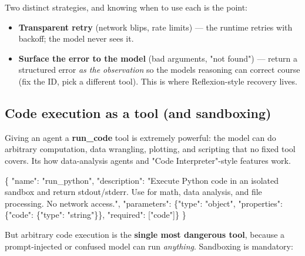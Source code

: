 \documentclass[11pt]{article}
\providecommand{\tightlist}{\setlength{\itemsep}{1pt}\setlength{\parskip}{0pt}}
\newenvironment{Shaded}{\begin{snugshade}}{\end{snugshade}}
\newcommand{\DataTypeTok}[1]{\textcolor[rgb]{0.16,0.50,0.73}{#1}}
\newcommand{\FunctionTok}[1]{\textcolor[rgb]{0.56,0.27,0.68}{#1}}
\newcommand{\OtherTok}[1]{\textcolor[rgb]{0.15,0.68,0.38}{#1}}
\newcommand{\StringTok}[1]{\textcolor[rgb]{0.96,0.31,0.31}{#1}}
\begin{document}
Two distinct strategies, and knowing when to use each is the point:

\begin{itemize}
\tightlist
\item
  \textbf{Transparent retry} (network blips, rate limits) --- the runtime retries with backoff; the model never sees it.
\item
  \textbf{Surface the error to the model} (bad arguments, "not found") --- return a structured error \emph{as the observation} so the model\textquotesingle s reasoning can correct course (fix the ID, pick a different tool). This is where Reflexion-style recovery lives.
\end{itemize}

\subsection{Code execution as a tool (and sandboxing)}\label{code-execution-as-a-tool-and-sandboxing}

Giving an agent a \textbf{run\_code} tool is extremely powerful: the model can do arbitrary computation, data wrangling, plotting, and scripting that no fixed tool covers. It\textquotesingle s how data-analysis agents and "Code Interpreter"-style features work.


\begin{Shaded}
\begin{Highlighting}[]
\FunctionTok{\{}
  \DataTypeTok{"name"}\FunctionTok{:} \StringTok{"run\_python"}\FunctionTok{,}
  \DataTypeTok{"description"}\FunctionTok{:} \StringTok{"Execute Python code in an isolated sandbox and return stdout/stderr. Use for math, data analysis, and file processing. No network access."}\FunctionTok{,}
  \DataTypeTok{"parameters"}\FunctionTok{:} \FunctionTok{\{}\DataTypeTok{"type"}\FunctionTok{:} \StringTok{"object"}\FunctionTok{,}
    \DataTypeTok{"properties"}\FunctionTok{:} \FunctionTok{\{}\DataTypeTok{"code"}\FunctionTok{:} \FunctionTok{\{}\DataTypeTok{"type"}\FunctionTok{:} \StringTok{"string"}\FunctionTok{\}\},} \DataTypeTok{"required"}\FunctionTok{:} \OtherTok{[}\StringTok{"code"}\OtherTok{]}\FunctionTok{\}}
\FunctionTok{\}}
\end{Highlighting}
\end{Shaded}

But arbitrary code execution is the \textbf{single most dangerous tool}, because a prompt-injected or confused model can run \emph{anything}. Sandboxing is mandatory:
\end{document}
